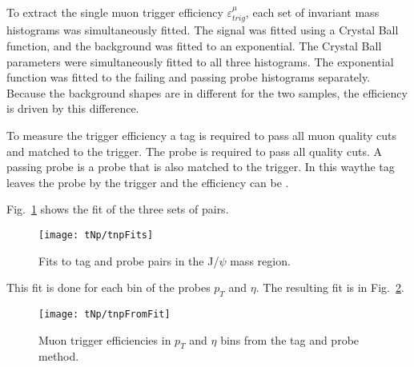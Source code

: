       To extract the single muon trigger efficiency $\varepsilon^{\mu}_{trig}$, 
        each set of invariant mass histograms was simultaneously fitted. 
      The signal was fitted using a Crystal Ball function, and the background 
        was fitted to an exponential.
      The Crystal Ball parameters were simultaneously fitted to all three 
        histograms.
      The exponential function was fitted to the failing and passing probe 
        histograms separately.
      Because the background shapes are in \DIFdelbegin {}\DIFdelend \DIFaddbegin {}\DIFaddend different for the two 
        samples, the efficiency is driven by this difference. 

      To measure the trigger efficiency a tag is required to pass all muon
        quality cuts and matched to the trigger.
      The probe is required to pass all quality cuts. 
      A passing probe is a probe that is also matched to the trigger. 
      In this way\DIFaddbegin \DIFadd{, }\DIFaddend the tag leaves the probe \DIFdelbegin {}\DIFdelend \DIFaddbegin {}\DIFaddend by the trigger and the 
        efficiency can be \DIFdelbegin {}\DIFdelend \DIFaddbegin {}\DIFaddend .  

      Fig.~\ref{fig:tnpFitPlot} shows the fit of the three sets of pairs. 
      \begin{figure}[!Hh]
        \centering
        \texttt{[image: tNp/tnpFits]}
        \caption{Fits to tag and probe pairs in the J/$\psi$ mass region.}
        \label{fig:tnpFitPlot}
      \end{figure}
      This fit is done for each bin of the probes $p_{T}$ and $\eta$.
      The resulting fit is in Fig.~\ref{fig:tnpTrigMap}.
      \begin{figure}[!Hhbt]
        \centering
        \texttt{[image: tNp/tnpFromFit]}
        \caption{Muon trigger efficiencies in $p_{T}$ and $\eta$ bins from 
          the tag and probe method.}
        \label{fig:tnpTrigMap}
      \end{figure}


